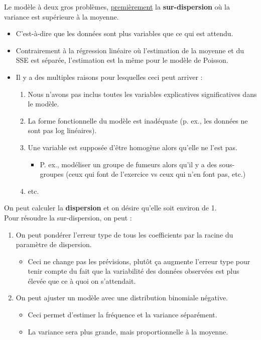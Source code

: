 \documentclass[10pt, french]{article}
\begin{document}
\begin{multicols*}{2}
Le modèle à deux gros problèmes, \underline{premièrement} la \textbf{sur-dispersion} où la variance est supérieure à la moyenne.
\begin{itemize}
		\item	C'est-à-dire que les données sont plus variables que ce qui est attendu.
		\item	Contrairement à la régression linéaire où l'estimation de la moyenne et du SSE est séparée, l'estimation est la même pour le modèle de Poisson.
		\item	Il y a des multiples raisons pour lesquelles ceci peut arriver : 
			\begin{enumerate}
			\item	Nous n'avons pas inclus toutes les variables explicatives significatives dans le modèle.
			\item	La forme fonctionnelle du modèle est inadéquate (p. ex., les données ne sont pas log linéaires).
			\item	Une variable est supposée d'être homogène alors qu'elle ne l'est pas.
				\begin{itemize}
				\item	P. ex., modéliser un groupe de fumeurs alors qu'il y a des sous-groupes (ceux qui font de l'exercice vs ceux qui n'en font pas, etc.)
				\end{itemize}
			\item	etc.
			\end{enumerate}
\end{itemize}

On peut calculer la \textbf{dispersion} et on désire qu'elle soit environ de 1.\\
Pour résoudre la sur-dispersion, on peut : 
\begin{enumerate}
	\item	On peut pondérer l'erreur type de tous les coefficients par la racine du paramètre de dispersion.
		\begin{itemize}
		\item	Ceci ne change pas les prévisions, plutôt ça augmente l'erreur type pour tenir compte du fait que la variabilité des données observées est plus élevée que ce à quoi on s'attendait.
		\end{itemize}
	\item	On peut ajuster un modèle avec une distribution binomiale négative.
		\begin{itemize}
		\item	Ceci permet d'estimer la fréquence et la variance séparément.
		\item	La variance sera plus grande, mais proportionnelle à la moyenne.
		\end{itemize}
\end{enumerate}



\end{multicols*}
\end{document}
